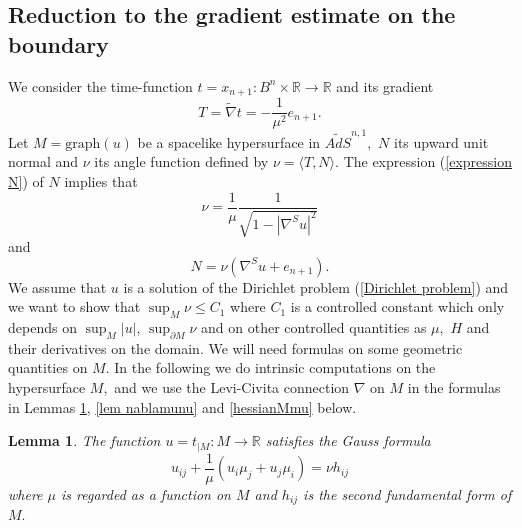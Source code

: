 \documentclass[10pt,reqno,oneside]{amsart}
\newtheorem{lem}{Lemma}[section]
\theoremstyle{definition}
\theoremstyle{remark}
\newcommand{\R}{\mathbb{R}}
\begin{document}
\subsection{Reduction to the gradient estimate on the boundary}
We consider the time-function $t=x_{n+1}:B^n\times\R\rightarrow\R$ and its gradient
$$T=\widetilde{\nabla} t=-\frac{1}{\mu^2}e_{n+1}.$$
Let $M=\mbox{graph}(u)$ be a spacelike hypersurface in $\widetilde{AdS}^{n,1},$ $N$ its upward unit normal and $\nu$ its angle function defined by $\nu=\langle T,N\rangle.$ The expression (\ref{expression N}) of $N$ implies that
\begin{equation}\label{notation est C1 expr nu}
\nu=\frac{1}{\mu}\frac{1}{\sqrt{1-|\nabla^Su|^2}}
\end{equation}
and
\begin{equation}\label{notation est C1 expr N}
N=\nu\left(\nabla^Su+e_{n+1}\right).
\end{equation}
We assume that $u$ is a solution of the Dirichlet problem (\ref{Dirichlet problem}) and we want to show that $\sup_M\nu\leq C_1$ where $C_1$ is a controlled constant which only depends on $\sup_M|u|$, $\sup_{\partial M}\nu$ and on other controlled quantities as $\mu,$ $H$ and their derivatives on the domain. We will need formulas on some geometric quantities on $M$. In the following we do intrinsic computations on the hypersurface $M,$ and we use the Levi-Civita connection $\nabla$ on $M$ in the formulas in Lemmas \ref{lem Gauss formula}, \ref{lem nablamunu} and \ref{hessianMmu} below.
\begin{lem}\label{lem Gauss formula}
The function $u=t_{|M}:M\rightarrow \R$ satisfies the Gauss formula
\begin{equation}\label{Gauss formula}
u_{ij}+\frac{1}{\mu}\left(u_i\mu_j+u_j\mu_i\right)=\nu h_{ij}
\end{equation}
where $\mu$ is regarded as a function on $M$ and $h_{ij}$ is the second fundamental form of $M.$
\end{lem}
\end{document}
